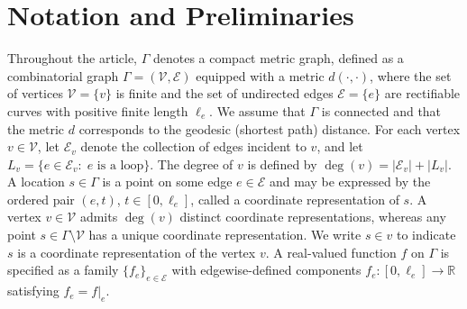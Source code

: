 \documentclass[numbers,webpdf]{ima-authoring-template}%
\theoremstyle{thmstyletwo}%
\numberwithin{equation}{section}
\begin{document}
\section{Notation and Preliminaries}
\label{notandpre}
%
Throughout the article, $\Gamma$ denotes a compact metric graph, defined as a combinatorial graph $\Gamma = (\mathcal{V}, \mathcal{E})$ equipped with a metric $d(\cdot,\cdot)$, where the set of vertices $\mathcal{V}=\{v\}$ is finite and the set of undirected edges $\mathcal{E} = \{e\}$ are rectifiable curves with positive finite length $\ell_e$. 
We assume that $\Gamma$ is connected and that the metric $d$ corresponds to the geodesic (shortest path) distance. For each vertex $v\in\mathcal{V}$, let $\mathcal{E}_{v}$ denote the collection of edges incident to $v$, and let $L_v=\{e\in\mathcal{E}_v:\; e \text{ is a loop}\}$. The degree of $v$ is defined by $\deg(v)=|\mathcal{E}_v|+|L_v|$. A location $s\in\Gamma$ is a point on some edge $e\in\mathcal{E}$ and may be expressed by the ordered pair $(e,t)$, $t\in[0,\ell_e]$, called a coordinate representation of $s$. A vertex $v\in\mathcal{V}$ admits $\deg(v)$ distinct coordinate representations, whereas any point $s\in\Gamma\setminus\mathcal{V}$ has a unique coordinate representation. We write $s\in v$ to indicate $s$ is a coordinate representation of the vertex $v$. A real-valued function $f$ on $\Gamma$ is specified as a family $\{f_e\}_{e\in\mathcal{E}}$ with edgewise-defined components $f_e:[0,\ell_e]\to\mathbb{R}$ satisfying  $f_e = f|_e$. 
\end{document}
